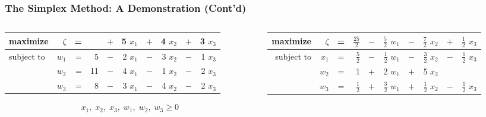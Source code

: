 \documentclass[usenames,dvipsnames,8pt]{beamer}%
\begin{document}
\begin{frame}
  \frametitle{The Simplex Method: A Demonstration (Cont'd)}
  \begin{columns}
    \begin{column}{0.5\textwidth}
      \begin{table}[ht]
        \centering
        \setlength\tabcolsep{2pt}
        \begin{tabular}{lrrrcrcrcr}
          \toprule
          maximize   &$\zeta$& = &   &\cellcolor{C2}\color{white} $+$ &\cellcolor{C2}\color{white} 5 $x_1$ & $+$ & 4 $x_2$ & $+$ & 3 $x_3$ \\
          \midrule
          subject to & $w_1$ & = & 5 & $-$ & 2 $x_1$ & $-$ & 3 $x_2$ & $-$ & 1 $x_3$ \\
                     & $w_2$ & = &11 & $-$ & 4 $x_1$ & $-$ & 1 $x_2$ & $-$ & 2 $x_3$ \\
                     & $w_3$ & = & 8 & $-$ & 3 $x_1$ & $-$ & 4 $x_2$ & $-$ & 2 $x_3$ \\ 
          \bottomrule
        \end{tabular}
      \end{table}
      \vspace{-0.4cm}
      \begin{align*}
        x_1,\;x_2,\;x_3,\;w_1,\;w_2,\;w_3\geqslant 0
      \end{align*}
    \end{column}
    \begin{column}{0.5\textwidth}
      \begin{table}[ht]
        \centering
        \setlength\tabcolsep{2pt}
        \begin{tabular}{rrcrcrcrcr}
          \toprule
          maximize   &$\zeta$& = &$\frac{25}{2}$ & $-$ & $\frac{5}{2}$ $w_1$ & $-$ & $\frac{7}{2}$ $x_2$ & $+$ & $\frac{1}{2}$ $x_3$\\
          \midrule
          subject to & $x_1$ & = & $\frac{5}{2}$ & $-$ & $\frac{1}{2}$ $w_1$ & $-$ & $\frac{3}{2}$ $x_2$ & $-$ & $\frac{1}{2}$ $x_3$\\
                     & $w_2$ & = &   1 & $+$ & 2   $w_1$ & $+$ & 5   $x_2$ &   &  \\
                     & $w_3$ & = & $\frac{1}{2}$ & $+$ & $\frac{3}{2}$ $w_1$ & $+$ & $\frac{1}{2}$ $x_2$ & $-$ & $\frac{1}{2}$ $x_3$\\ 
          \bottomrule
        \end{tabular}
      \end{table}
      \vspace{-0.4cm}

\end{column}
\end{columns}
\end{frame}
\end{document}

